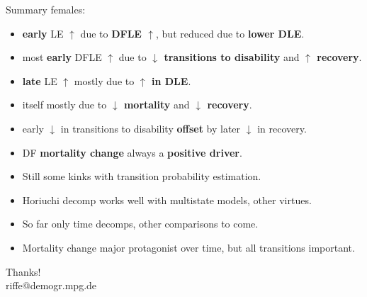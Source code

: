 \documentclass[20pt,usenames,dvipsnames]{beamer}
\begin{document}
\begin{frame}[plain]
\Large
\begin{center}
Summary females:
\begin{itemize}[<+->]
\item \textbf{early} LE $\uparrow$ due to \textbf{DFLE $\uparrow$}, but reduced due to \textbf{lower DLE}.
\item most \textbf{early} DFLE $\uparrow$ due to \textbf{$\downarrow$ transitions to disability} and \textbf{$\uparrow$ recovery}.
\item \textbf{late} LE $\uparrow$ mostly due to \textbf{$\uparrow$ in DLE}.
\item itself mostly due to \textbf{$\downarrow$ mortality} and \textbf{$\downarrow$ recovery}.
\item early $\downarrow$ in transitions to disability \textbf{offset} by later $\downarrow$ in recovery.
\item DF \textbf{mortality change} always a \textbf{positive driver}.
\end{itemize}
\end{center}
\end{frame}

\begin{frame}[plain]
\Large
\begin{center}
\begin{itemize}[<+->]
\item Still some kinks with transition probability estimation.
\item Horiuchi decomp works well with multistate models, other virtues.
\item So far only time decomps, other comparisons to come.
\item Mortality change major protagonist over time, but all transitions important.
\end{itemize}
\pause
Thanks!\\
riffe@demogr.mpg.de
\end{center}
\end{frame}


\end{document}

